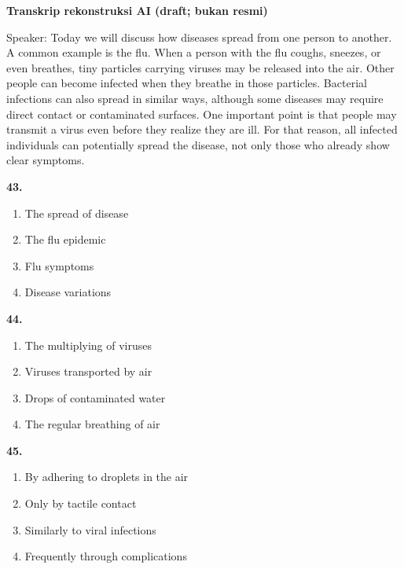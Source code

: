 \documentclass[12pt]{article}
\begin{document}
\par
\vspace{0.25\baselineskip}
\begin{exampleblock}
\textbf{Transkrip rekonstruksi AI (draft; bukan resmi)}\par
Speaker: Today we will discuss how diseases spread from one person to another. A common example is the flu. When a person with the flu coughs, sneezes, or even breathes, tiny particles carrying viruses may be released into the air. Other people can become infected when they breathe in those particles. Bacterial infections can also spread in similar ways, although some diseases may require direct contact or contaminated surfaces. One important point is that people may transmit a virus even before they realize they are ill. For that reason, all infected individuals can potentially spread the disease, not only those who already show clear symptoms.\par
\end{exampleblock}
\noindent\textbf{43.}
\begin{enumerate}[label=(\Alph*),leftmargin=*,itemsep=0.2em]
\item The spread of disease
\item The flu epidemic
\item Flu symptoms
\item Disease variations
\end{enumerate}
\par
\vspace{0.25\baselineskip}
\noindent\textbf{44.}
\begin{enumerate}[label=(\Alph*),leftmargin=*,itemsep=0.2em]
\item The multiplying of viruses
\item Viruses transported by air
\item Drops of contaminated water
\item The regular breathing of air
\end{enumerate}
\par
\vspace{0.25\baselineskip}
\noindent\textbf{45.}
\begin{enumerate}[label=(\Alph*),leftmargin=*,itemsep=0.2em]
\item By adhering to droplets in the air
\item Only by tactile contact
\item Similarly to viral infections
\item Frequently through complications
\end{enumerate}
\end{document}
